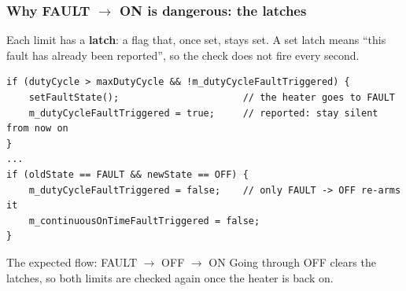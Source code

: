 \begin{frame}[fragile]
  \frametitle{Why FAULT $\to$ ON is dangerous: the latches} \small
{}

\vspace{-0.35cm}

Each limit has a {\bf latch}: a flag that, once set, stays set. A set latch means
``this fault has already been reported'', so the check does not fire every second.

\begin{lstlisting}[style=cpp]
if (dutyCycle > maxDutyCycle && !m_dutyCycleFaultTriggered) {
    setFaultState();                      // the heater goes to FAULT
    m_dutyCycleFaultTriggered = true;     // reported: stay silent from now on
}
...
if (oldState == FAULT && newState == OFF) {
    m_dutyCycleFaultTriggered = false;    // only FAULT -> OFF re-arms it
    m_continuousOnTimeFaultTriggered = false;
}
\end{lstlisting}

\pause

\begin{block}{The expected flow: FAULT $\to$ OFF $\to$ ON}\small
Going through OFF clears the latches, so both limits are checked again once the heater
is back on.
\end{block}

\end{frame}
